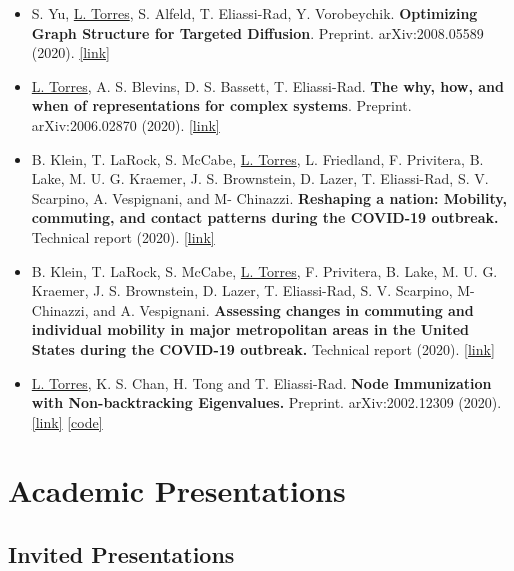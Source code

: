 \documentclass[12pt,]{scrartcl}
\newenvironment{myitemize}
{ \begin{itemize}
    \setlength{\itemsep}{5pt}
    \setlength{\parskip}{0pt}
    \setlength{\parsep}{0pt}     }
{ \end{itemize}                  }
\begin{document}
\begin{myitemize}
\leftskip-0.25in %

\item S. Yu, \underline{L. Torres}, S. Alfeld, T. Eliassi-Rad, Y. Vorobeychik. \textbf{Optimizing Graph Structure for Targeted Diffusion}. Preprint. 
arXiv:2008.05589 (2020). \href{https://arxiv.org/abs/2008.05589}{[link]}

\item \underline{L. Torres}, A. S. Blevins, D. S. Bassett, T. Eliassi-Rad. \textbf{The why, how, and when of representations for complex systems}. Preprint. arXiv:2006.02870 (2020). \href{https://arxiv.org/abs/2006.02870}{[link]}

\item B. Klein, T. LaRock, S. McCabe, \underline{L. Torres}, L. Friedland, F. Privitera, B. Lake, M. U. G. Kraemer, J. S. Brownstein, D. Lazer, T. Eliassi-Rad, S. V. Scarpino, A. Vespignani, and M- Chinazzi. \textbf{Reshaping a nation: Mobility, commuting, and contact patterns during the COVID-19 outbreak.} Technical report (2020). \href{https://www.mobs-lab.org/uploads/6/7/8/7/6787877/covid19mobility_report2.pdf}{[link]}

\item B. Klein, T. LaRock, S. McCabe, \underline{L. Torres}, F. Privitera, B. Lake, M. U. G. Kraemer, J. S. Brownstein, D. Lazer, T. Eliassi-Rad, S. V. Scarpino, M- Chinazzi, and A. Vespignani. \textbf{Assessing changes in commuting and individual mobility in major metropolitan areas in the United States during the COVID-19 outbreak.} Technical report (2020). \href{https://www.mobs-lab.org/uploads/6/7/8/7/6787877/assessing_mobility_changes_in_the_united_states_during_the_covid_19_outbreak.pdf}{[link]}

\item \underline{L. Torres}, K. S. Chan, H. Tong and T. Eliassi-Rad. \textbf{Node Immunization with Non-backtracking Eigenvalues.} Preprint. arXiv:2002.12309 (2020). \href{https://arxiv.org/abs/2002.12309}{[link]} \href{https://github.com/leotrs/inbox}{[code]}

\end{myitemize}


\section{Academic Presentations}\label{presentations}

\subsection{Invited Presentations}\label{invited-presentations}
\end{document}
